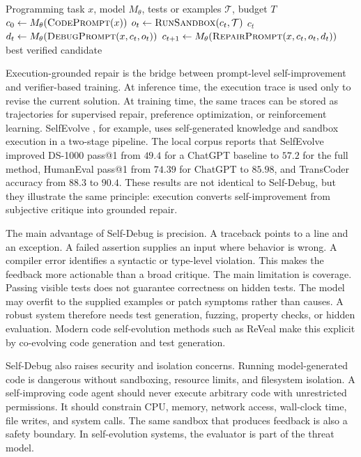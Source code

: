 \begin{algorithm}[t]
\caption{Execution-grounded Self-Debug}
\label{alg:self-debug}
\begin{algorithmic}[1]
\Require Programming task $x$, model $M_\theta$, tests or examples $\mathcal{T}$, budget $T$
\State $c_0 \gets M_\theta(\textsc{CodePrompt}(x))$
    \State $o_t \gets \textsc{RunSandbox}(c_t,\mathcal{T})$
        \State \Return $c_t$
    \EndIf
    \State $d_t \gets M_\theta(\textsc{DebugPrompt}(x,c_t,o_t))$
    \State $c_{t+1} \gets M_\theta(\textsc{RepairPrompt}(x,c_t,o_t,d_t))$
\EndFor
\State \Return best verified candidate
\end{algorithmic}
\end{algorithm}

Execution-grounded repair is the bridge between prompt-level self-improvement and verifier-based training. At inference time, the execution trace is used only to revise the current solution. At training time, the same traces can be stored as trajectories for supervised repair, preference optimization, or reinforcement learning. SelfEvolve \cite{jiang2023selfevolve}, for example, uses self-generated knowledge and sandbox execution in a two-stage pipeline. The local corpus reports that SelfEvolve improved DS-1000 pass@1 from $49.4$ for a ChatGPT baseline to $57.2$ for the full method, HumanEval \cite{humaneval2021} pass@1 from $74.39$ for ChatGPT to $85.98$, and TransCoder accuracy from $88.3$ to $90.4$. These results are not identical to Self-Debug, but they illustrate the same principle: execution converts self-improvement from subjective critique into grounded repair.

The main advantage of Self-Debug is precision. A traceback points to a line and an exception. A failed assertion supplies an input where behavior is wrong. A compiler error identifies a syntactic or type-level violation. This makes the feedback more actionable than a broad critique. The main limitation is coverage. Passing visible tests does not guarantee correctness on hidden tests. The model may overfit to the supplied examples or patch symptoms rather than causes. A robust system therefore needs test generation, fuzzing, property checks, or hidden evaluation. Modern code self-evolution methods such as ReVeal \cite{jin2025reveal} \cite{jin2025reveal} make this explicit by co-evolving code generation and test generation.

Self-Debug also raises security and isolation concerns. Running model-generated code is dangerous without sandboxing, resource limits, and filesystem isolation. A self-improving code agent should never execute arbitrary code with unrestricted permissions. It should constrain CPU, memory, network access, wall-clock time, file writes, and system calls. The same sandbox that produces feedback is also a safety boundary. In self-evolution systems, the evaluator is part of the threat model.

